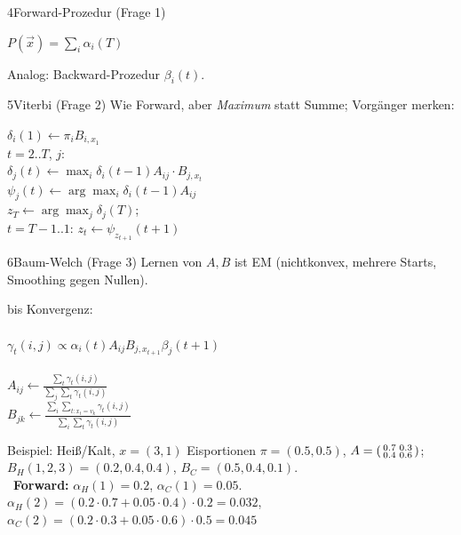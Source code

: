 \begin{hngrid}
\begin{hnp}[raster multicolumn=3,acc=hnnavy]{4}{Forward-Prozedur (Frage 1)}
\begin{pcode}[Forward]
 $P(\vec x)=\sum_i\alpha_i(T)$
\end{pcode}
Analog: Backward-Prozedur $\beta_i(t)$.
\end{hnp}
%
\begin{hnp}[raster multicolumn=3,acc=hngreen]{5}{Viterbi (Frage 2)}
Wie Forward, aber \emph{Maximum} statt Summe; Vorgänger merken:
\begin{pcode}[Viterbi]
$\delta_i(1)\leftarrow\pi_iB_{i,x_1}$\\
 $t=2..T$,  $j$:\\
\hii $\delta_j(t)\leftarrow\max_i\delta_i(t{-}1)A_{ij}\cdot B_{j,x_t}$\\
\hii $\psi_j(t)\leftarrow\arg\max_i\delta_i(t{-}1)A_{ij}$\\
$z_T\leftarrow\arg\max_j\delta_j(T)$;\\
 $t=T{-}1..1$: $z_t\leftarrow\psi_{z_{t+1}}(t{+}1)$ \ 
\end{pcode}
\end{hnp}
%
\begin{hnp}[raster multicolumn=3,acc=hnrose]{6}{Baum-Welch (Frage 3)}
Lernen von $A,B$ ist EM (nichtkonvex, mehrere Starts, Smoothing gegen Nullen).
\begin{pcode}
 bis Konvergenz:\\
\hii {}\\
\hii $\gamma_t(i,j)\propto\alpha_i(t)A_{ij}B_{j,x_{t+1}}\beta_j(t{+}1)$\\
\hii {}\\
\hii $A_{ij}\leftarrow\frac{\sum_t\gamma_t(i,j)}{\sum_j\sum_t\gamma_t(i,j)}$\\
\hii $B_{jk}\leftarrow\frac{\sum_i\sum_{t:x_t=v_k}\gamma_t(i,j)}{\sum_i\sum_t\gamma_t(i,j)}$
\end{pcode}
\end{hnp}
%
\begin{hnex}[raster multicolumn=3]{Beispiel: Heiß/Kalt, $x=(3,1)$ Eisportionen}
$\pi=(0.5,0.5)$, $A=\begin{psmallmatrix}0.7&0.3\\0.4&0.6\end{psmallmatrix}$; $B_{H}(1,2,3)=(0.2,0.4,0.4)$, $B_{C}=(0.5,0.4,0.1)$.\\
\hnsol\ \textbf{Forward:} $\alpha_H(1)=0.2$, $\alpha_C(1)=0.05$.\\
$\alpha_H(2)=(0.2\cdot0.7+0.05\cdot0.4)\cdot0.2=0.032$, $\alpha_C(2)=(0.2\cdot0.3+0.05\cdot0.6)\cdot0.5=0.045$\\

\end{hnex}
\end{hngrid}
